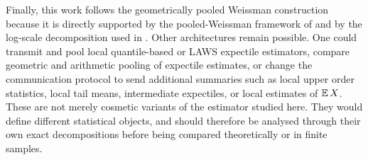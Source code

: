 Finally, this work follows the geometrically pooled Weissman construction
because it is directly supported by the pooled-Weissman framework of
\textcite[Theorem~2 and Corollary~8]{DaouiaPadoanStupfler2021} and by the
log-scale decomposition used in . Other architectures remain
possible. One could transmit and pool local quantile-based or LAWS expectile
estimators, compare geometric and arithmetic pooling of expectile estimates,
or change the communication protocol to send additional summaries such as local
upper order statistics, local tail means, intermediate expectiles, or local
estimates of \(\operatorname{\mathbb{E}} X\). These are not merely cosmetic variants of the estimator
studied here. They would
define different statistical objects, and should therefore be analysed through
their own exact decompositions before being compared theoretically or in
finite samples.
